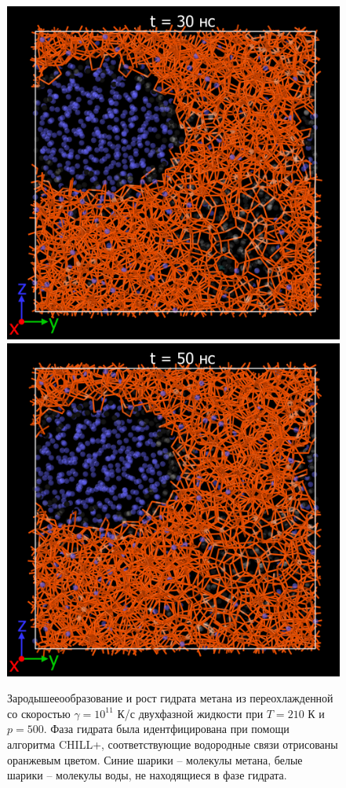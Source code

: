\begin{figure}[H]
\begin{minipage}{\linewidth}
        \includegraphics[width=.325\linewidth]{figures/nuclei5.png}
        \includegraphics[width=.325\linewidth]{figures/nuclei6.png}
    \end{minipage}
    \caption{Зародышееообразование и рост гидрата метана из переохлажденной со скоростью $\gamma=10^{11}$ К/с двухфазной жидкости при $T=210$ К и $p=500$. Фаза гидрата была идентфицирована при помощи алгоритма CHILL+, соответствующие водородные связи отрисованы оранжевым цветом. Синие шарики -- молекулы метана, белые шарики -- молекулы воды, не находящиеся в фазе гидрата.}
    \label{fig3.5}
\end{figure}

